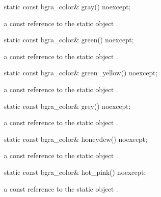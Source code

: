 \begin{itemdecl}
static const bgra_color& gray() noexcept;
\end{itemdecl}
\begin{itemdescr}
\pnum
\returns
a const reference to the static  object .
\end{itemdescr}

\begin{itemdecl}
static const bgra_color& green() noexcept;
\end{itemdecl}
\begin{itemdescr}
\pnum
\returns
a const reference to the static  object .
\end{itemdescr}

\begin{itemdecl}
static const bgra_color& green_yellow() noexcept;
\end{itemdecl}
\begin{itemdescr}
\pnum
\returns
a const reference to the static  object .
\end{itemdescr}

\begin{itemdecl}
static const bgra_color& grey() noexcept;
\end{itemdecl}
\begin{itemdescr}
\pnum
\returns
a const reference to the static  object .
\end{itemdescr}

\begin{itemdecl}
static const bgra_color& honeydew() noexcept;
\end{itemdecl}
\begin{itemdescr}
\pnum
\returns
a const reference to the static  object .
\end{itemdescr}

\begin{itemdecl}
static const bgra_color& hot_pink() noexcept;
\end{itemdecl}
\begin{itemdescr}
\pnum
\returns
a const reference to the static  object .
\end{itemdescr}

